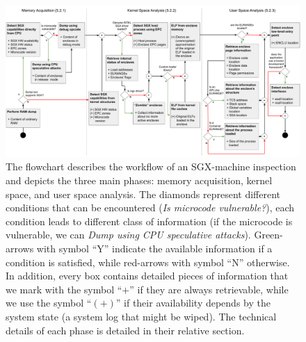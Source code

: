 \begin{figure}
	\centering
	\includegraphics[width=\linewidth]{fig_c8/final_schema_sgx.pdf}
	\caption[Flowchart for memory forensics analysis in an SGX-machine.]
		{The flowchart describes the workflow of an SGX-machine inspection 
		and depicts the three main phases: memory acquisition, kernel space, 
		and user space analysis.
		The diamonds represent different conditions that can be encountered 
		(\eg \emph{Is microcode vulnerable?}), each condition leads to 		
		different class of information (\eg if the microcode is vulnerable, we 
		can \emph{Dump using CPU speculative attacks}). Green-arrows with 
		symbol ``Y'' indicate the available information if a condition is 
		satisfied, while red-arrows with symbol ``N'' otherwise.
		In addition, every box contains detailed pieces of information that we 
		mark with the symbol ``$+$'' if they are always retrievable, while we 
		use the symbol ``$(+)$'' if their availability depends by the system 
		state (\eg a system log that might be wiped). 
		The technical details of each phase is detailed in their relative 
		section.}
	\label{fig:analysis-map}
\end{figure}


